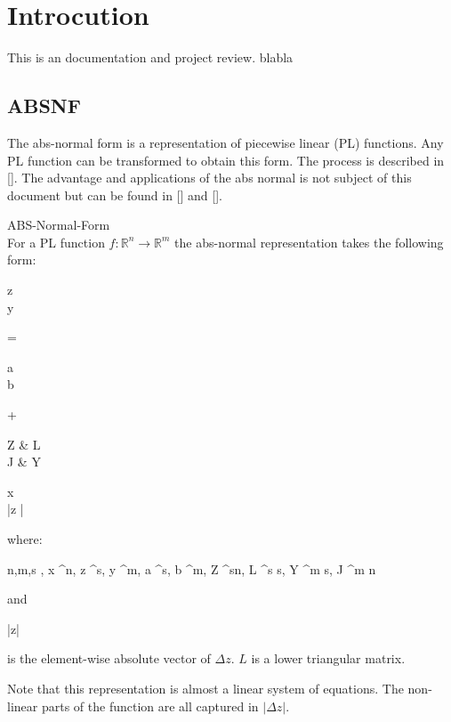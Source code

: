 \section{Introcution}

This is an documentation and project review. blabla

\subsection{ABSNF}
The abs-normal form is a representation of piecewise linear (PL) functions. Any PL function can be transformed to obtain  this form. The process is described in []. The advantage and applications of the abs normal is not subject of this document but can be found in [] and [].

\begin{mydef*}
	ABS-Normal-Form \\
	For a PL function $f:\mathbb{R}^n \rightarrow \mathbb{R}^m$ the abs-normal representation takes the following form:
	\begin{flalign} \label{absnf}
	\begin{pmatrix}
	\Delta z \\
	\Delta y
	\end{pmatrix}
	= 
	\begin{pmatrix}
	a \\
	b
	\end{pmatrix}
	+
	\begin{pmatrix}
	Z & L \\
	J & Y 
	\end{pmatrix}
	\times
	\begin{pmatrix}
	\Delta x \\
	|\Delta z |
	\end{pmatrix}
	\end{flalign}
	where:
	\begin{flalign*}
		n,m,s \in {}, \Delta x \in {}^n, \Delta z \in {}^s, \Delta y \in {}^m, a \in {}^s, b \in {}^{m}, Z \in {}^{s\times n}, L \in {}^{s \times s}, Y \in {}^{m \times s}, J \in {}^{m \times n}
	\end{flalign*}
	and 
	\begin{flalign*}
		|\Delta z|
	\end{flalign*}
	is the element-wise absolute vector of $\Delta z$. $L$ is a lower triangular matrix.
\end{mydef*}
Note that this representation is almost a linear system of equations. The non-linear parts of the function are all captured in $|\Delta z|$.

